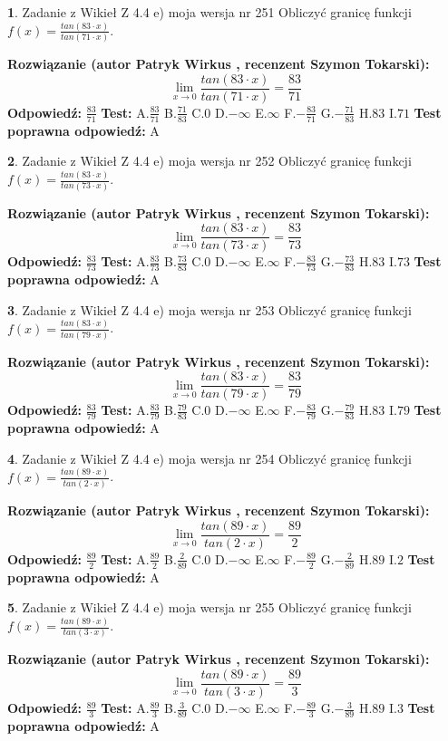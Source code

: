 \documentclass[12pt, a4paper]{article}
\theoremstyle{definition} %
\newtheorem{zad}{}
\newcommand{\zadStart}[1]{\begin{zad}#1\newline}
\newcommand{\zadStop}{\end{zad}}
\newcommand{\rozwStart}[2]{\noindent \textbf{Rozwiązanie (autor #1 , recenzent #2): }\newline}
\newcommand{\rozwStop}{\newline}
\newcommand{\odpStart}{\noindent \textbf{Odpowiedź:}\newline}
\newcommand{\odpStop}{\newline}
\newcommand{\testStart}{\noindent \textbf{Test:}\newline}
\newcommand{\testStop}{\newline}
\newcommand{\kluczStart}{\noindent \textbf{Test poprawna odpowiedź:}\newline}
\newcommand{\kluczStop}{\newline}
\begin{document}
\zadStart{Zadanie z Wikieł Z 4.4 e) moja wersja nr 251}
Obliczyć granicę funkcji $f(x)=\frac{tan(83\cdot x)}{tan(71\cdot x)}$.
\zadStop
\rozwStart{Patryk Wirkus}{Szymon Tokarski}
$$\lim\limits_{x\to 0}\frac{tan(83\cdot x)}{tan(71\cdot x)}=
\frac{83}{71}$$
\rozwStop
\odpStart
$\frac{83}{71}$
\odpStop
\testStart
A.$\frac{83}{71}$
B.$\frac{71}{83}$
C.$0$
D.$-\infty$
E.$\infty$
F.$-\frac{83}{71}$
G.$-\frac{71}{83}$
H.$83$
I.$71$
\testStop
\kluczStart
A
\kluczStop



\zadStart{Zadanie z Wikieł Z 4.4 e) moja wersja nr 252}
Obliczyć granicę funkcji $f(x)=\frac{tan(83\cdot x)}{tan(73\cdot x)}$.
\zadStop
\rozwStart{Patryk Wirkus}{Szymon Tokarski}
$$\lim\limits_{x\to 0}\frac{tan(83\cdot x)}{tan(73\cdot x)}=
\frac{83}{73}$$
\rozwStop
\odpStart
$\frac{83}{73}$
\odpStop
\testStart
A.$\frac{83}{73}$
B.$\frac{73}{83}$
C.$0$
D.$-\infty$
E.$\infty$
F.$-\frac{83}{73}$
G.$-\frac{73}{83}$
H.$83$
I.$73$
\testStop
\kluczStart
A
\kluczStop



\zadStart{Zadanie z Wikieł Z 4.4 e) moja wersja nr 253}
Obliczyć granicę funkcji $f(x)=\frac{tan(83\cdot x)}{tan(79\cdot x)}$.
\zadStop
\rozwStart{Patryk Wirkus}{Szymon Tokarski}
$$\lim\limits_{x\to 0}\frac{tan(83\cdot x)}{tan(79\cdot x)}=
\frac{83}{79}$$
\rozwStop
\odpStart
$\frac{83}{79}$
\odpStop
\testStart
A.$\frac{83}{79}$
B.$\frac{79}{83}$
C.$0$
D.$-\infty$
E.$\infty$
F.$-\frac{83}{79}$
G.$-\frac{79}{83}$
H.$83$
I.$79$
\testStop
\kluczStart
A
\kluczStop



\zadStart{Zadanie z Wikieł Z 4.4 e) moja wersja nr 254}
Obliczyć granicę funkcji $f(x)=\frac{tan(89\cdot x)}{tan(2\cdot x)}$.
\zadStop
\rozwStart{Patryk Wirkus}{Szymon Tokarski}
$$\lim\limits_{x\to 0}\frac{tan(89\cdot x)}{tan(2\cdot x)}=
\frac{89}{2}$$
\rozwStop
\odpStart
$\frac{89}{2}$
\odpStop
\testStart
A.$\frac{89}{2}$
B.$\frac{2}{89}$
C.$0$
D.$-\infty$
E.$\infty$
F.$-\frac{89}{2}$
G.$-\frac{2}{89}$
H.$89$
I.$2$
\testStop
\kluczStart
A
\kluczStop



\zadStart{Zadanie z Wikieł Z 4.4 e) moja wersja nr 255}
Obliczyć granicę funkcji $f(x)=\frac{tan(89\cdot x)}{tan(3\cdot x)}$.
\zadStop
\rozwStart{Patryk Wirkus}{Szymon Tokarski}
$$\lim\limits_{x\to 0}\frac{tan(89\cdot x)}{tan(3\cdot x)}=
\frac{89}{3}$$
\rozwStop
\odpStart
$\frac{89}{3}$
\odpStop
\testStart
A.$\frac{89}{3}$
B.$\frac{3}{89}$
C.$0$
D.$-\infty$
E.$\infty$
F.$-\frac{89}{3}$
G.$-\frac{3}{89}$
H.$89$
I.$3$
\testStop
\kluczStart
A
\kluczStop
\end{document}
